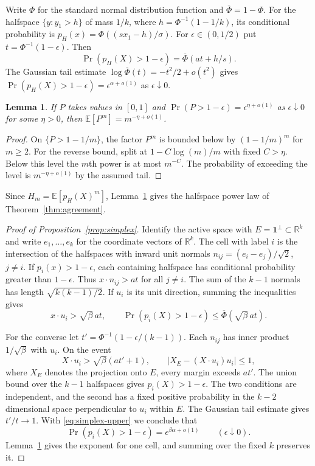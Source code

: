 \documentclass[11pt,reqno]{amsart}
\newtheorem{lemma}[theorem]{Lemma}
\newcommand{\R}{\mathbb R}
\newcommand{\E}{\mathbb E}
\newcommand{\one}{\mathbf 1}
\newcommand{\Phib}{\overline{\Phi}}
\begin{document}
Write $\Phi$ for the standard normal distribution function and
$\Phib=1-\Phi$. For the halfspace $\{y:y_1>h\}$ of mass $1/k$,
where $h=\Phi^{-1}(1-1/k)$, its conditional probability is
$p_H(x)=\Phi((sx_1-h)/\sigma)$. For $\epsilon\in(0,1/2)$ put
$t=\Phi^{-1}(1-\epsilon)$. Then
\begin{equation}\label{eq:halfspace-tail}
 \Pr(p_H(X)>1-\epsilon)=\Phib(at+h/s).
\end{equation}
The Gaussian tail estimate $\log\Phib(t)=-t^2/2+o(t^2)$ gives
$\Pr(p_H(X)>1-\epsilon)=\epsilon^{\alpha+o(1)}$ as
$\epsilon\downarrow0$.

\begin{lemma}\label{lem:posterior-powers}
If $P$ takes values in $[0,1]$ and
$\Pr(P>1-\epsilon)=\epsilon^{\eta+o(1)}$ as $\epsilon\downarrow0$
for some $\eta>0$, then $\E[P^m]=m^{-\eta+o(1)}$.
\end{lemma}

\begin{proof}
On $\{P>1-1/m\}$, the factor $P^m$ is bounded below by
$(1-1/m)^m$ for $m\ge2$. For the reverse bound, split at
$1-C\log(m)/m$ with fixed $C>\eta$. Below this level the $m$th power
is at most $m^{-C}$. The probability of exceeding the level is
$m^{-\eta+o(1)}$ by the assumed tail.
\end{proof}

Since $H_m=\E[p_H(X)^m]$, Lemma~\ref{lem:posterior-powers} gives the
halfspace power law of Theorem~\ref{thm:agreement}.

\begin{proof}[Proof of Proposition~\ref{prop:simplex}]
Identify the active space with $E=\one^\perp\subset\R^k$ and write
$e_1,\ldots,e_k$ for the coordinate vectors of $\R^k$. The cell
with label $i$ is the intersection of the halfspaces with inward
unit normals $n_{ij}=(e_i-e_j)/\sqrt2$, $j\ne i$.
If $p_i(x)>1-\epsilon$, each containing halfspace has conditional
probability greater than $1-\epsilon$. Thus
$x\cdot n_{ij}>at$ for all $j\ne i$.
The sum of the $k-1$ normals has length $\sqrt{k(k-1)/2}$.
If $u_i$ is its unit direction, summing the inequalities gives
\begin{equation}\label{eq:simplex-upper}
 x\cdot u_i>\sqrt{\beta}\,at,\qquad
 \Pr(p_i(X)>1-\epsilon)\le\Phib(\sqrt{\beta}\,at).
\end{equation}

For the converse let $t'=\Phi^{-1}(1-\epsilon/(k-1))$. Each
$n_{ij}$ has inner product $1/\sqrt{\beta}$ with $u_i$.
On the event
\[
 X\cdot u_i>\sqrt{\beta}(at'+1),\qquad
 \big|X_E-(X\cdot u_i)u_i\big|\le1,
\]
where $X_E$ denotes the projection onto $E$, every margin exceeds
$at'$. The union bound over the $k-1$ halfspaces gives
$p_i(X)>1-\epsilon$. The two conditions are independent, and
the second has a fixed positive probability in the $k-2$ dimensional
space perpendicular to $u_i$ within $E$. The Gaussian tail estimate
gives $t'/t\to1$. With \eqref{eq:simplex-upper} we conclude that
\[
 \Pr(p_i(X)>1-\epsilon)=\epsilon^{\beta\alpha+o(1)}
 \qquad(\epsilon\downarrow0).
\]
Lemma~\ref{lem:posterior-powers} gives the exponent for one cell, and
summing over the fixed $k$ preserves it.
\end{proof}
\end{document}
